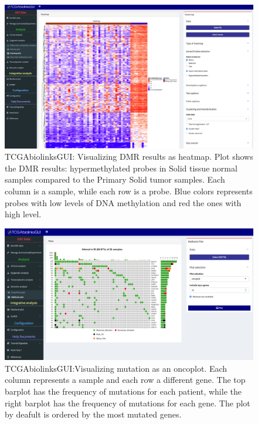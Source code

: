 \begin{figure}
\includegraphics[width=1.0\linewidth]{images/gui_heatmap.png}
\caption[TCGAbiolinksGUI: Visualizing DMR results as heatmap]{TCGAbiolinksGUI: Visualizing DMR results as heatmap. Plot shows the DMR results: hypermethylated probes in Solid tissue normal samples compared to the Primary Solid tumor samples. Each column is a sample, while each row is a probe. Blue colors represents probes with low levels of DNA methylation and red the ones with high level. }
\label{fig:gui_heatmap}
\end{figure}


\begin{figure}
\includegraphics[width=1.0\linewidth]{images/maftools_oncoplot.png}
\caption[TCGAbiolinksGUI: Visualizing mutation as an oncoplot]{TCGAbiolinksGUI:Visualizing mutation as an oncoplot. Each column
represents a sample and each row a different gene. The top barplot has the frequency of mutations for each patient, while
the right barplot has the frequency of mutations for each gene. The plot by deafult is ordered by the most mutated genes.}
\label{fig:maftoools_oncoplot}
\end{figure}



